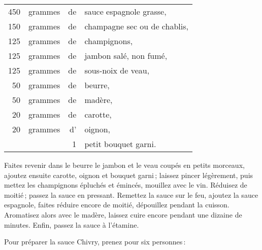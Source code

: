 \footnotesize
\begin{longtable}{rrrp{16em}}
    450 & grammes & de & sauce espagnole grasse,                                                          \\
    150 & grammes & de & champagne sec ou de chablis,                                                     \\
    125 & grammes & de & champignons,                                                                     \\
    125 & grammes & de & jambon salé, non fumé,                                                           \\
    125 & grammes & de & sous-noix de veau,                                                               \\
     50 & grammes & de & beurre,                                                                          \\
     50 & grammes & de & madère,                                                                          \\
     20 & grammes & de & carotte,                                                                         \\
     20 & grammes & d' & oignon,                                                                          \\
        &         &  1 & petit bouquet garni.                                                             \\
\end{longtable}
\normalsize

Faites revenir dans le beurre le jambon et le veau coupés en petits morceaux,
ajoutez ensuite carotte, oignon et bouquet garni ; laissez pincer légèrement,
puis mettez les champignons épluchés et émincés, mouillez avec le vin. Réduisez
de moitié ; passez la sauce en pressant. Remettez la sauce sur le feu, ajoutez
la sauce espagnole, faites réduire encore de moitié, dépouillez pendant la
cuisson. Aromatisez alors avec le madère, laissez cuire encore pendant une
dizaine de minutes. Enfin, passez la sauce à l'étamine.

\sk
\newpage

Pour préparer la sauce Chivry, prenez pour six personnes :

\medskip

